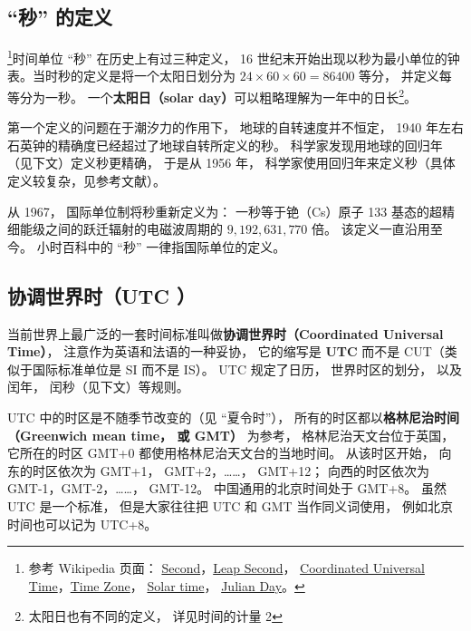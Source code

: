 
\begin{issues}
\end{issues}

\subsection{“秒” 的定义}
\footnote{参考 Wikipedia 页面： \href{https://en.wikipedia.org/wiki/Second}{Second}，\href{https://en.wikipedia.org/wiki/Leap_second}{Leap Second}， \href{https://en.wikipedia.org/wiki/Coordinated_Universal_Time}{Coordinated Universal Time}，\href{https://en.wikipedia.org/wiki/Time_zone}{Time Zone}， \href{https://en.wikipedia.org/wiki/Solar_time}{Solar time}， \href{https://en.wikipedia.org/wiki/Julian_day}{Julian Day}。}时间单位 “秒” 在历史上有过三种定义， 16 世纪末开始出现以秒为最小单位的钟表。当时秒的定义是将一个太阳日划分为 $24\times60\times60 = 86400$ 等分， 并定义每等分为一秒。 一个\textbf{太阳日（solar day）}可以粗略理解为一年中的日长\footnote{太阳日也有不同的定义， 详见时间的计量 2}。

第一个定义的问题在于潮汐力的作用下， 地球的自转速度并不恒定， 1940 年左右石英钟的精确度已经超过了地球自转所定义的秒。 科学家发现用地球的回归年（见下文）定义秒更精确， 于是从 1956 年， 科学家使用回归年来定义秒（具体定义较复杂，见参考文献）。

从 1967， 国际单位制将秒重新定义为： 一秒等于铯（Cs）原子 133 基态的超精细能级之间的跃迁辐射的电磁波周期的 $9,192,631,770$ 倍。 该定义一直沿用至今。 小时百科中的 “秒” 一律指国际单位的定义。

\subsection{协调世界时（UTC ）}
当前世界上最广泛的一套时间标准叫做\textbf{协调世界时（Coordinated Universal Time）}， 注意作为英语和法语的一种妥协， 它的缩写是 \textbf{UTC} 而不是 CUT（类似于国际标准单位是 SI 而不是 IS）。 UTC 规定了日历， 世界时区的划分， 以及闰年， 闰秒（见下文）等规则。

UTC 中的时区是不随季节改变的（见 “夏令时”）， 所有的时区都以\textbf{格林尼治时间（Greenwich mean time， 或 GMT）} 为参考， 格林尼治天文台位于英国， 它所在的时区 GMT+0 都使用格林尼治天文台的当地时间。 从该时区开始， 向东的时区依次为 GMT+1， GMT+2，……， GMT+12； 向西的时区依次为 GMT-1，GMT-2，……， GMT-12。 中国通用的北京时间处于 GMT+8。 虽然 UTC 是一个标准， 但是大家往往把 UTC 和 GMT 当作同义词使用， 例如北京时间也可以记为 UTC+8。

